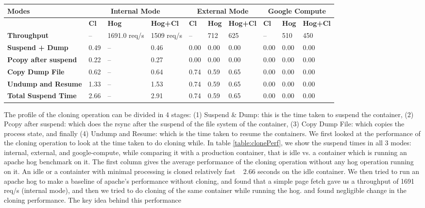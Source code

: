 \begin{table*}[ht]
  \centering
    \begin{tabular}{ | p{4cm} | l | l | l | l | l | l | l | l | l |}
    \hline
    \textbf{Modes} & \multicolumn{3}{|c|}{\textbf{Internal Mode}} & \multicolumn{3}{|c|}{\textbf{External Mode}} & \multicolumn{3}{|c|}{\textbf{Google Compute}}\\\hline
    \textbf{ } & \textbf{Cl} & \textbf{Hog} & \textbf{Hog+Cl} & \textbf{Cl} & \textbf{Hog} & \textbf{Hog+Cl} & \textbf{Cl} & \textbf{Hog} & \textbf{Hog+Cl} \\ \hline
    \hline
    \textbf{Throughput} & -- & 1691.0 req/s & 1509 req/s & -- & 712 & 625 & -- & 510 & 450\\ \hline
    \hline
    \textbf{Suspend + Dump} & 0.49 & -- & 0.46 & 0.00 & 0.00 & 0.00 & 0.00 & 0.00 & 0.00\\ \hline
    \textbf{Pcopy after suspend} & 0.22 & -- & 0.27 & 0.00 & 0.00 & 0.00 & 0.00 & 0.00 & 0.00\\ \hline
    \textbf{Copy Dump File} & 0.62 &  -- & 0.64 & 0.74 & 0.59 & 0.65 & 0.00 & 0.00 & 0.00\\ \hline
    \textbf{Undump and Resume} & 1.33 &  -- & 1.53 & 0.74 & 0.59 & 0.65 & 0.00 & 0.00 & 0.00\\ \hline 
    \hline
    \textbf{Total Suspend Time} & 2.66 &  -- & 2.91 & 0.74 & 0.59 & 0.65 & 0.00 & 0.00 & 0.00\\ \hline
    \end{tabular}
\caption{Performance of Live Cloning (external mode) with a random file dump process running in the container}
\label{table:clonePerf}
\end{table*}

The profile of the cloning operation can be divided in 4 stages: 
(1) Suspend \& Dump: this is the time taken to suspend the container, 
(2) Pcopy after suspend: which does the rsync after the suspend of the file system of the container, 
(3) Copy Dump File: which copies the process state, and finally 
(4) Undump and Resume: which is the time taken to resume the containers. 
We first looked at the performance of the cloning operation to look at the time taken to do cloning while. 
In table \ref {table:clonePerf}, we show the suspend times in all 3 modes: internal, external, and google-compute, while comparing it with a production container, that is idle vs. a container which is running an apache hog benchmark \cite{httperf} on it. 
The first column gives the average performance of the cloning operation without any hog operation running on it.  
An idle or a containter with minimal processing is cloned relatively fast ~ 2.66 seconds on the idle container. 
We then tried to run an apache hog to make a baseline of apache's performance without cloning, and found that a simple page fetch gave us a throughput of 1691 req/s (internal mode), and then we tried to do cloning of the same container while running the hog. and found negligible change in the cloning performance.
The key idea behind this performance 

